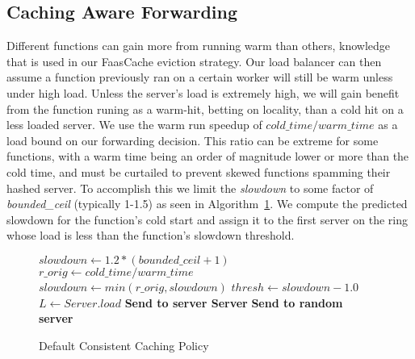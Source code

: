 \subsection{Caching Aware Forwarding}

Different functions can gain more from running warm than others, knowledge that is used in our FaasCache eviction strategy.
Our load balancer can then assume a function previously ran on a certain worker will still be warm unless under high load.
Unless the server's load is extremely high, we will gain benefit from the function runing as a warm-hit, betting on locality, than a cold hit on a less loaded server.
We use the warm run speedup of $cold\_time / warm\_time$ as a load bound on our forwarding decision.
This ratio can be extreme for some functions, with a warm time being an order of magnitude lower or more than the cold time, and must be curtailed to prevent skewed functions spamming their hashed server.
To accomplish this we limit the \textit{slowdown} to some factor of \textit{bounded\_ceil} (typically 1-1.5) as seen in Algorithm~\ref{algo:ConsistentCachePolicy}.
We compute the predicted slowdown for the function's cold start and assign it to the first server on the ring whose load is less than the function's slowdown threshold.


\begin{figure}
  \begin{algorithmic}[1]
    \State $slowdown \gets 1.2*(bounded\_ceil+1)$
      \State $r\_orig \gets cold\_time / warm\_time$
      \State $slowdown \gets min(r\_orig, slowdown)$
    \EndIf
    \State $thresh \gets slowdown-1.0$
      \State $L \gets Server.load$
        \State \textbf{Send to server Server}
      \EndIf
    \EndFor
    \State \textbf{Send to random server}
  \end{algorithmic}
  \caption{Default Consistent Caching Policy}
\label{algo:ConsistentCachePolicy}    
\end{figure}

